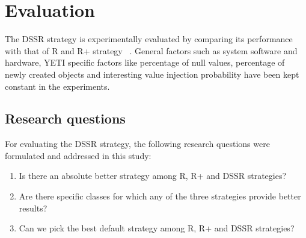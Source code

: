 \documentclass[conference]{IEEEtran}
\begin{document}








\section{Evaluation}\label{sec:eval}
\noindent The DSSR strategy is experimentally evaluated by comparing its performance with that of R and R+ strategy ~\cite{Leitner2007}. General factors such as system software and hardware, YETI specific factors like percentage of null values, percentage of newly created objects and interesting value injection probability have been kept constant in the experiments.

\subsection{Research questions}
\noindent For evaluating the DSSR strategy, the following research questions were formulated and addressed in this study:
\begin{enumerate}
\item Is there an absolute better strategy among R, R+ and DSSR strategies?
\item Are there specific classes for which any of the three strategies provide better results?
\item Can we pick the best default strategy among R, R+ and DSSR strategies?
\end{enumerate}
\end{document}
